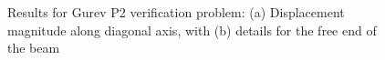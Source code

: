 \begin{figure}[ht]
{\label{fig:gurev2-2}}		
%
\caption{Results for Gurev P2 verification problem: (a) Displacement magnitude along diagonal axis, with (b) details for the free end of the beam}
\label{fig:gurev2}
\end{figure}

\begin{figure}[ht!]
\centering
{}		
\subfigure[]{%
}
\end{figure}
